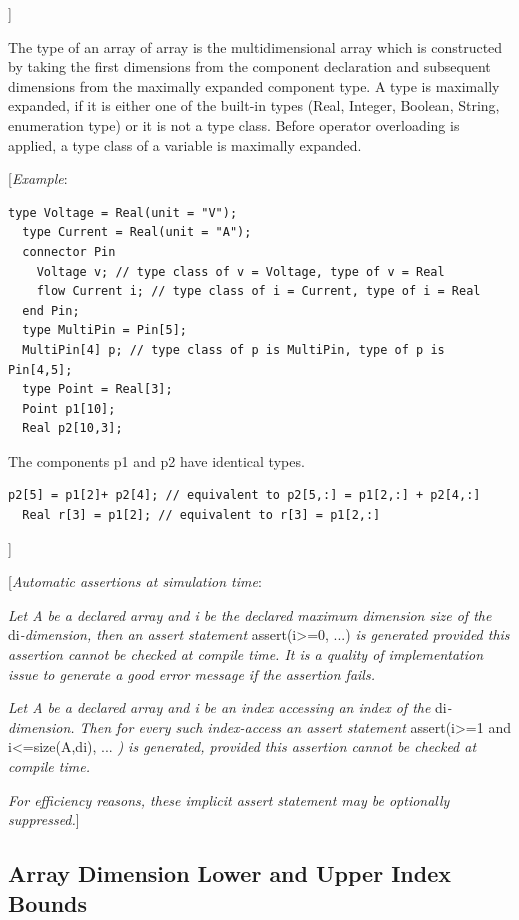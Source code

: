 \documentclass[10pt,a4paper]{report}
\def\doublelabel#1{\label{#1}}
\begin{document}
{]}

The type of an array of array is the multidimensional array which is
constructed by taking the first dimensions from the component
declaration and subsequent dimensions from the maximally expanded
component type. A type is maximally expanded, if it is either one of the
built-in types (Real, Integer, Boolean, String, enumeration type) or it
is not a type class. Before operator overloading is applied, a type
class of a variable is maximally expanded.

{[}\emph{Example}:

\begin{lstlisting}[language=modelica]
  type Voltage = Real(unit = "V");
  type Current = Real(unit = "A");
  connector Pin
    Voltage v; // type class of v = Voltage, type of v = Real
    flow Current i; // type class of i = Current, type of i = Real
  end Pin;
  type MultiPin = Pin[5];
  MultiPin[4] p; // type class of p is MultiPin, type of p is Pin[4,5];
  type Point = Real[3];
  Point p1[10];
  Real p2[10,3];
\end{lstlisting}
  The components p1 and p2 have identical types.
\begin{lstlisting}[language=modelica]
  p2[5] = p1[2]+ p2[4]; // equivalent to p2[5,:] = p1[2,:] + p2[4,:]
  Real r[3] = p1[2]; // equivalent to r[3] = p1[2,:]
\end{lstlisting}
{]}

{[}\emph{Automatic assertions at simulation time}:

\emph{Let A be a declared array and i be the declared maximum dimension
size of the} di\emph{-dimension, then an assert statement}
assert(i\textgreater{}=0, ...) \emph{is generated provided this
assertion cannot be checked at compile time. It is a quality of
implementation issue to generate a good error message if the assertion
fails.}

\emph{Let A be a declared array and i be an index accessing an index of
the} di\emph{-dimension. Then for every such index-access an assert
statement} assert(i\textgreater{}=1 and i\textless{}=size(A,di), ...
\emph{) is generated, provided this assertion cannot be checked at
compile time.}

\emph{For efficiency reasons, these implicit assert statement may be
optionally suppressed.}{]}

\subsection{Array Dimension Lower and Upper Index Bounds}\doublelabel{array-dimension-lower-and-upper-index-bounds}
\end{document}
